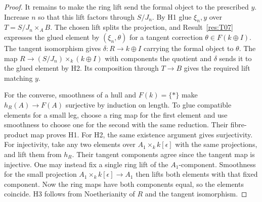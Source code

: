 \documentclass[11pt,oneside,openany]{book}
\theoremstyle{definition}
\theoremstyle{remark}
\begin{document}
\begin{proof}
It remains to make the ring lift send the formal object to the
prescribed \(y\). Increase \(n\) so that this lift factors through
\(S/J_n\). By H1 glue \(\xi_n,y\) over \(T=S/J_n\times_A B\).
The chosen lift splits the projection, and Result~\ref{res:T07}
expresses the glued element by \((\xi_n,\theta)\) for a tangent
correction \(\theta\in F(k\oplus I)\). The tangent isomorphism
gives \(\delta:R\to k\oplus I\) carrying the formal object to
\(\theta\). The map \(R\to (S/J_n)\times_k(k\oplus I)\) with
components the quotient and \(\delta\) sends it to the glued
element by H2. Its composition through \(T\to B\) gives the
required lift matching \(y\).

For the converse, smoothness of a hull and \(F(k)=\{*\}\) make
\(h_R(A)\to F(A)\) surjective by induction on length.
To glue compatible elements for a small leg, choose a ring map
for the first element and use smoothness to choose one for the
second with the same reduction. Their fibre-product map proves H1.
For H2, the same existence argument gives surjectivity. For
injectivity, take any two elements over \(A_1\times_k k[\epsilon]\)
with the same projections, and lift them from \(h_R\).
Their tangent components agree since the tangent map is injective.
One may instead fix a single ring lift of the \(A_1\)-component.
Smoothness for the small projection
\(A_1\times_k k[\epsilon]\to A_1\) then lifts both elements with
that fixed component. Now the ring maps have both components
equal, so the elements coincide. H3 follows from Noetherianity
of \(R\) and the tangent isomorphism.
\end{proof}
\end{document}
